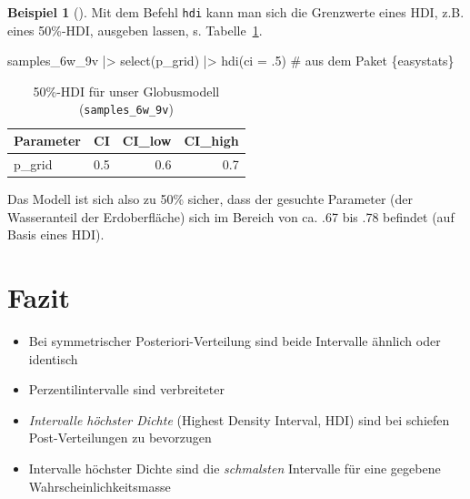 \documentclass[
  ngerman,
  letterpaper,
  twoside,
  open=any]{scrbook}
\newenvironment{Shaded}{\begin{snugshade}}{\end{snugshade}}
\newcommand{\AttributeTok}[1]{\textcolor[rgb]{0.40,0.45,0.13}{#1}}
\newcommand{\CommentTok}[1]{\textcolor[rgb]{0.37,0.37,0.37}{#1}}
\newcommand{\DecValTok}[1]{\textcolor[rgb]{0.68,0.00,0.00}{#1}}
\newcommand{\FunctionTok}[1]{\textcolor[rgb]{0.28,0.35,0.67}{#1}}
\newcommand{\NormalTok}[1]{\textcolor[rgb]{0.00,0.23,0.31}{#1}}
\newcommand{\SpecialCharTok}[1]{\textcolor[rgb]{0.37,0.37,0.37}{#1}}
\providecommand{\tightlist}{%
  \setlength{\itemsep}{0pt}\setlength{\parskip}{0pt}}\usepackage{longtable,booktabs,array}
\theoremstyle{definition}
\newtheorem{example}{Beispiel}[chapter]
\theoremstyle{plain}
\theoremstyle{definition}
\theoremstyle{definition}
\theoremstyle{remark}
\begin{document}
\begin{example}[]
Mit dem Befehl \texttt{hdi} kann man sich die Grenzwerte eines HDI, z.B.
eines 50\%-HDI, ausgeben lassen, s. Tabelle~\ref{tbl-samples_6w_9v-hdi}.

\begin{Shaded}
\begin{Highlighting}[]
\NormalTok{samples\_6w\_9v }\SpecialCharTok{|\textgreater{}} 
  \FunctionTok{select}\NormalTok{(p\_grid) }\SpecialCharTok{|\textgreater{}} 
  \FunctionTok{hdi}\NormalTok{(}\AttributeTok{ci =}\NormalTok{ .}\DecValTok{5}\NormalTok{)  }\CommentTok{\# aus dem Paket \textasciigrave{}\{easystats\}\textasciigrave{}}
\end{Highlighting}
\end{Shaded}

{

\begin{longtable}[]{@{}lrrr@{}}

\caption{\label{tbl-samples_6w_9v-hdi}50\%-HDI für unser Globusmodell
(\texttt{samples\_6w\_9v})}

\tabularnewline

\toprule\noalign{}
Parameter & CI & CI\_low & CI\_high \\
\midrule\noalign{}
\endhead
\bottomrule\noalign{}
\endlastfoot
p\_grid & 0.5 & 0.6 & 0.7 \\

\end{longtable}

}

Das Modell ist sich also zu 50\% sicher, dass der gesuchte Parameter
(der Wasseranteil der Erdoberfläche) sich im Bereich von ca. .67 bis .78
befindet (auf Basis eines HDI).

\section{Fazit}\label{fazit-1}

\begin{itemize}
\tightlist
\item
  Bei symmetrischer Posteriori-Verteilung sind beide Intervalle ähnlich
  oder identisch
\item
  Perzentilintervalle sind verbreiteter
\item
  \emph{Intervalle höchster Dichte} (Highest Density Interval, HDI) sind
  bei schiefen Post-Verteilungen zu bevorzugen
\item
  Intervalle höchster Dichte sind die \emph{schmalsten} Intervalle für
  eine gegebene Wahrscheinlichkeitsmasse
\end{itemize}


\end{example}
\end{document}
